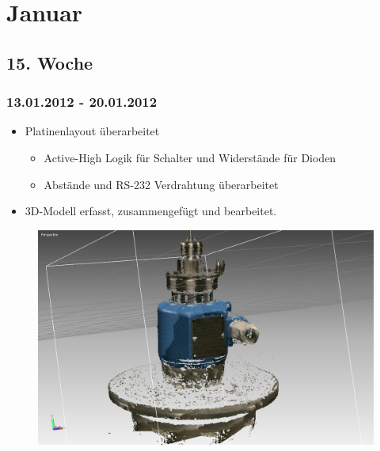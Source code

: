 \documentclass[ngerman]{beamer}
\begin{document}
\section{Januar}
\subsection{15. Woche}
\begin{frame}\frametitle{13.01.2012 - 20.01.2012}
\label{Aktuelle Folie}
\begin{itemize}
	\item Platinenlayout überarbeitet
	\begin{itemize}
		\item Active-High Logik für Schalter und Widerstände für Dioden
		\item Abstände und RS-232 Verdrahtung überarbeitet
	\end{itemize}
	\item 3D-Modell erfasst, zusammengefügt und bearbeitet.
\end{itemize}
\begin{figure}
\caption{\protect\includegraphics[scale=0.37]{./_Res/Motor_3_8T_gut_tt-registerd_merged}}
\end{figure}
\end{frame}
\end{document}
